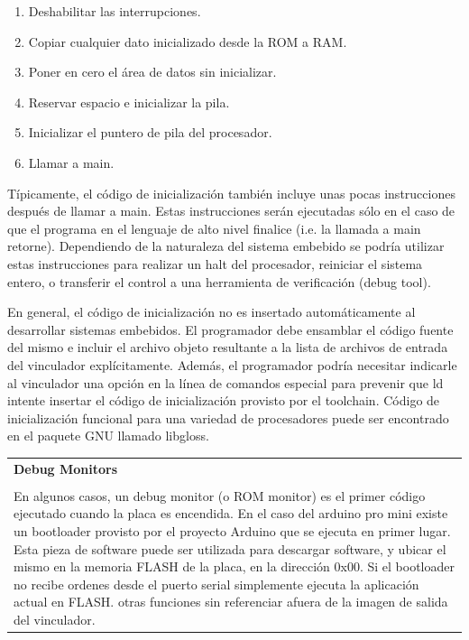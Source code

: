 \documentclass[output=paper, 
colorlinks,
citecolor=brown,
newtxmath
]{langscibook}
\begin{document}
\begin{enumerate}
\item Deshabilitar las interrupciones.
\item Copiar cualquier dato inicializado desde la ROM a RAM.
\item Poner en cero el área de datos sin inicializar.
\item Reservar espacio e inicializar la pila.
\item Inicializar el puntero de pila del procesador.
\item Llamar a main.
\end{enumerate}

Típicamente, el código de inicialización también incluye unas pocas
instrucciones después de llamar a main. Estas instrucciones serán ejecutadas
sólo en el caso de que el programa en el lenguaje de alto nivel finalice (i.e.
la llamada a main retorne). Dependiendo de la naturaleza del sistema embebido
se podría utilizar estas instrucciones para realizar un halt del procesador, 
reiniciar el sistema entero, o transferir el control a una herramienta
de verificación (debug tool).

En general, el código de inicialización no es insertado automáticamente al desarrollar sistemas embebidos. El
programador debe ensamblar el código fuente del mismo e incluir el archivo objeto resultante a la 
lista de archivos de entrada del vinculador explícitamente. Además, el programador
podría necesitar indicarle al vinculador una opción en la línea de comandos especial
para prevenir que ld intente insertar el código de inicialización provisto
por el toolchain.
Código de inicialización funcional para una variedad de procesadores puede
ser encontrado en el paquete GNU llamado libgloss.


\begin{center}
\begin{tabularx}{\textwidth}{|X|}
\hline
\rowcolor{lightgray}
\textbf{Debug Monitors} \\ \\
En algunos casos, un debug monitor (o ROM monitor) es el primer código
ejecutado cuando la placa es encendida. En el caso del arduino pro mini
existe un bootloader provisto por el proyecto Arduino que se ejecuta en primer lugar.
Esta pieza de software puede ser utilizada
para descargar software, y ubicar el mismo en la memoria FLASH de la placa, en la dirección 0x00.
Si el bootloader no recibe ordenes desde el puerto serial simplemente ejecuta la aplicación
actual en FLASH.
otras funciones sin referenciar afuera de la imagen de salida
del vinculador.\\
\hline
\end{tabularx}
\end{center}
\end{document}
